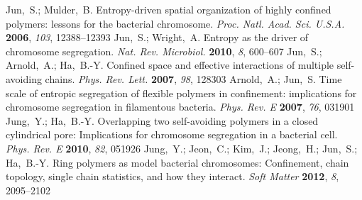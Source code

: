 \documentclass[journal=mamobx,manuscript=article,layout=twocolumn]{achemso}
\begin{document}
\begin{mcitethebibliography}{52}
{\mcitedefaultendpunct}{\mcitedefaultseppunct}\relax
\EndOfBibitem
{}
Jun,~S.; Mulder,~B. Entropy-driven spatial organization of highly confined
  polymers: lessons for the bacterial chromosome. \emph{Proc. Natl. Acad. Sci.
  U.S.A.} \textbf{2006}, \emph{103}, 12388--12393\relax
\mciteBstWouldAddEndPuncttrue
\mciteSetBstMidEndSepPunct{\mcitedefaultmidpunct}
{\mcitedefaultendpunct}{\mcitedefaultseppunct}\relax
\EndOfBibitem
{}
Jun,~S.; Wright,~A. Entropy as the driver of chromosome segregation. \emph{Nat.
  Rev. Microbiol.} \textbf{2010}, \emph{8}, 600--607\relax
\mciteBstWouldAddEndPuncttrue
\mciteSetBstMidEndSepPunct{\mcitedefaultmidpunct}
{\mcitedefaultendpunct}{\mcitedefaultseppunct}\relax
\EndOfBibitem
{}
Jun,~S.; Arnold,~A.; Ha,~B.-Y. Confined space and effective interactions of
  multiple self-avoiding chains. \emph{Phys. Rev. Lett.} \textbf{2007},
  \emph{98}, 128303\relax
\mciteBstWouldAddEndPuncttrue
\mciteSetBstMidEndSepPunct{\mcitedefaultmidpunct}
{\mcitedefaultendpunct}{\mcitedefaultseppunct}\relax
\EndOfBibitem
{}
Arnold,~A.; Jun,~S. Time scale of entropic segregation of flexible polymers in
  confinement: implications for chromosome segregation in filamentous bacteria.
  \emph{Phys. Rev. E} \textbf{2007}, \emph{76}, 031901\relax
\mciteBstWouldAddEndPuncttrue
\mciteSetBstMidEndSepPunct{\mcitedefaultmidpunct}
{\mcitedefaultendpunct}{\mcitedefaultseppunct}\relax
\EndOfBibitem
{}
Jung,~Y.; Ha,~B.-Y. Overlapping two self-avoiding polymers in a closed
  cylindrical pore: Implications for chromosome segregation in a bacterial
  cell. \emph{Phys. Rev. E} \textbf{2010}, \emph{82}, 051926\relax
\mciteBstWouldAddEndPuncttrue
\mciteSetBstMidEndSepPunct{\mcitedefaultmidpunct}
{\mcitedefaultendpunct}{\mcitedefaultseppunct}\relax
\EndOfBibitem
{}
Jung,~Y.; Jeon,~C.; Kim,~J.; Jeong,~H.; Jun,~S.; Ha,~B.-Y. Ring polymers as
  model bacterial chromosomes: Confinement, chain topology, single chain
  statistics, and how they interact. \emph{Soft Matter} \textbf{2012},
  \emph{8}, 2095--2102\relax
\mciteBstWouldAddEndPuncttrue
\mciteSetBstMidEndSepPunct{\mcitedefaultmidpunct}
{\mcitedefaultendpunct}{\mcitedefaultseppunct}\relax
\EndOfBibitem
{}

\end{mcitethebibliography}
\end{document}
